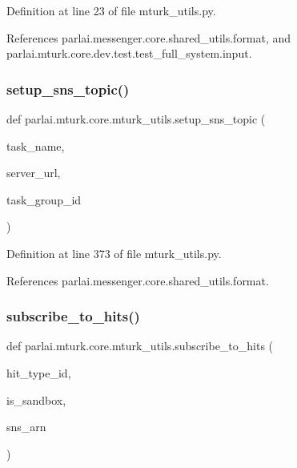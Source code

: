 Definition at line 23 of file mturk\+\_\+utils.\+py.



References parlai.\+messenger.\+core.\+shared\+\_\+utils.\+format, and parlai.\+mturk.\+core.\+dev.\+test.\+test\+\_\+full\+\_\+system.\+input.

\mbox{\label{namespaceparlai_1_1mturk_1_1core_1_1mturk__utils_a98c01409407393818d100c21a4e07742}} 
\subsubsection{\texorpdfstring{setup\+\_\+sns\+\_\+topic()}{setup\_sns\_topic()}}
{\footnotesize\ttfamily def parlai.\+mturk.\+core.\+mturk\+\_\+utils.\+setup\+\_\+sns\+\_\+topic (\begin{DoxyParamCaption}\item[{}]{task\+\_\+name,  }\item[{}]{server\+\_\+url,  }\item[{}]{task\+\_\+group\+\_\+id }\end{DoxyParamCaption})}



Definition at line 373 of file mturk\+\_\+utils.\+py.



References parlai.\+messenger.\+core.\+shared\+\_\+utils.\+format.

\mbox{\label{namespaceparlai_1_1mturk_1_1core_1_1mturk__utils_accc5838e30ccf9ab95050ab11ac0d973}} 
\subsubsection{\texorpdfstring{subscribe\+\_\+to\+\_\+hits()}{subscribe\_to\_hits()}}
{\footnotesize\ttfamily def parlai.\+mturk.\+core.\+mturk\+\_\+utils.\+subscribe\+\_\+to\+\_\+hits (\begin{DoxyParamCaption}\item[{}]{hit\+\_\+type\+\_\+id,  }\item[{}]{is\+\_\+sandbox,  }\item[{}]{sns\+\_\+arn }\end{DoxyParamCaption})}



